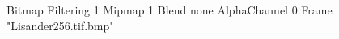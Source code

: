 {Bitmap
	{Filtering 1}
	{Mipmap 1}
	{Blend none}
	{AlphaChannel 0}
	{Frame "Lisander256.tif.bmp"}
}
